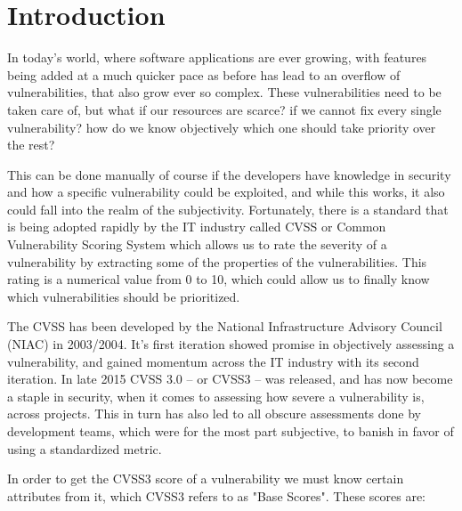 
\chapter{Introduction}\label{chapter:Introduction}

In today's world, where software applications are ever growing, with features being added at a much quicker pace as before has lead to an overflow of vulnerabilities, that also grow ever so complex. These vulnerabilities need to be taken care of, but what if our resources are scarce? if we cannot fix every single vulnerability? how do we know objectively which one should take priority over the rest?

This can be done manually of course if the developers have knowledge in security and how a specific vulnerability could be exploited, and while this works, it also could fall into the realm of the subjectivity. Fortunately, there is a standard that is being adopted rapidly by the IT industry called CVSS or Common Vulnerability Scoring System \parencite{cvss3} which allows us to rate the severity of a vulnerability by extracting some of the properties of the vulnerabilities. This rating is a numerical value from 0 to 10, which could allow us to finally know which vulnerabilities should be prioritized. 

The CVSS has been developed by the National Infrastructure Advisory Council (NIAC) in 2003/2004. It's first iteration showed promise in objectively assessing a vulnerability, and gained momentum across the IT industry with its second iteration. In late 2015 CVSS 3.0 -- or CVSS3 -- was released, and has now become a staple in security, when it comes to assessing how severe a vulnerability is, across projects. This in turn has also led to all obscure assessments done by development teams, which were for the most part subjective, to banish in favor of using a standardized metric.

In order to get the CVSS3 score of a vulnerability we must know certain attributes from it, which CVSS3 refers to as "Base Scores"\parencite{cvss3}. These scores are:

